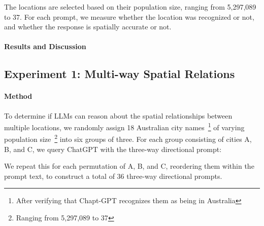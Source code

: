 \begin{center}
\end{center}

The locations are selected based on their population size, ranging from 5,297,089 to 37. 
For each prompt, we measure whether the location was recognized or not, and whether the response is spatially accurate or not. 

\paragraph{Results and Discussion}




\subsection{Experiment 1: Multi-way Spatial Relations}
\paragraph{Method}
To determine if LLMs can reason about the spatial relationships between multiple locations, we randomly assign 18 Australian city names~\footnote{After verifying that Chapt-GPT recognizes them as being in Australia} of varying population size~\footnote{Ranging from 5,297,089 to 37} into six groups of three.
For each group consisting of cities A, B, and C, we query ChatGPT with the three-way directional prompt: 
\begin{center}
\end{center}

We repeat this for each permutation of A, B, and C, reordering them within the prompt text, to construct a total of 36 three-way directional prompts.

